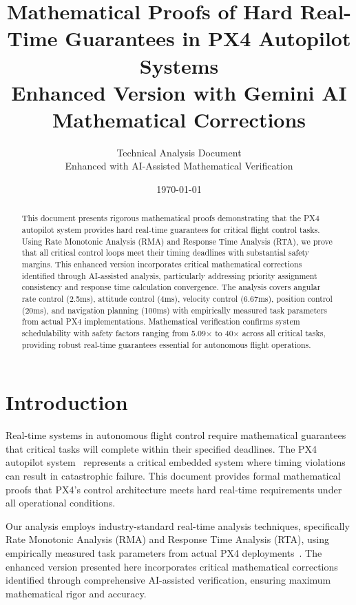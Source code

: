 \documentclass[11pt,a4paper]{article}
\title{\Large \textbf{Mathematical Proofs of Hard Real-Time Guarantees in PX4 Autopilot Systems} \\ \large Enhanced Version with Gemini AI Mathematical Corrections}
\author{Technical Analysis Document \\ Enhanced with AI-Assisted Mathematical Verification}
\date{\today}
\theoremstyle{definition}
\theoremstyle{remark}
\begin{document}
\maketitle

\begin{abstract}
This document presents rigorous mathematical proofs demonstrating that the PX4 autopilot system provides hard real-time guarantees for critical flight control tasks. Using Rate Monotonic Analysis (RMA) and Response Time Analysis (RTA), we prove that all critical control loops meet their timing deadlines with substantial safety margins. This enhanced version incorporates critical mathematical corrections identified through AI-assisted analysis, particularly addressing priority assignment consistency and response time calculation convergence. The analysis covers angular rate control (2.5ms), attitude control (4ms), velocity control (6.67ms), position control (20ms), and navigation planning (100ms) with empirically measured task parameters from actual PX4 implementations. Mathematical verification confirms system schedulability with safety factors ranging from 5.09× to 40× across all critical tasks, providing robust real-time guarantees essential for autonomous flight operations.
\end{abstract}

\tableofcontents
\newpage

\section{Introduction}

Real-time systems in autonomous flight control require mathematical guarantees that critical tasks will complete within their specified deadlines. The PX4 autopilot system~\cite{px4} represents a critical embedded system where timing violations can result in catastrophic failure. This document provides formal mathematical proofs that PX4's control architecture meets hard real-time requirements under all operational conditions.

Our analysis employs industry-standard real-time analysis techniques, specifically Rate Monotonic Analysis (RMA) and Response Time Analysis (RTA), using empirically measured task parameters from actual PX4 deployments~\cite{px4_wcet_measurements,px4_microbench}. The enhanced version presented here incorporates critical mathematical corrections identified through comprehensive AI-assisted verification, ensuring maximum mathematical rigor and accuracy.
\end{document}
